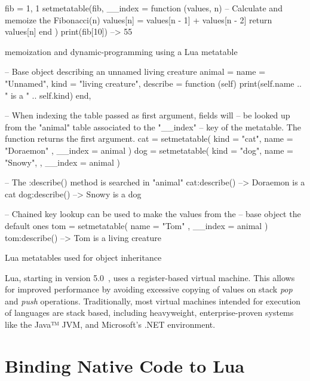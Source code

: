\begin{listing}[H]
  \begin{luacode}
    fib = { 1, 1 }
    setmetatable(fib, {
      __index = function (values, n)
        -- Calculate and memoize the Fibonacci(n)
        values[n] = values[n - 1] + values[n - 2]
        return values[n]
      end
    })
    print(fib[10])  --> 55
  \end{luacode}
  \caption{\Gls{memoization} and \gls{dynamic-programming} using a Lua metatable}
	\label{lst:lua-example-memoize}
\end{listing}

\begin{listing}[H]
  \begin{luacode}
    -- Base object describing an unnamed living creature
    animal = {
      name = "Unnamed",
      kind = "living creature",
      describe = function (self)
        print(self.name .. " is a " .. self.kind)
      end,
    }

    -- When indexing the table passed as first argument, fields will
    -- be looked up from the "animal" table associated to the "__index"
    -- key of the metatable. The function returns the first argument.
    cat = setmetatable({ kind = "cat", name = "Doraemon" },
                       { __index = animal })
    dog = setmetatable({ kind = "dog", name = "Snowy", },
                       { __index = animal })

    -- The :describe() method is searched in "animal"
    cat:describe()  --> Doraemon is a cat
    dog:describe()  --> Snowy is a dog

    -- Chained key lookup can be used to make the values from the
    -- base object the default ones
    tom = setmetatable({ name = "Tom" }, { __index = animal  })
    tom:describe()  --> Tom is a living creature
  \end{luacode}
  \caption{Lua metatables used for object inheritance}
  \label{lst:lua-example-meta-oo}
\end{listing}

Lua, starting in version 5.0~\cite{lua50-impl}, uses a register-based virtual
machine. This allows for improved performance by avoiding excessive copying of
values on stack \emph{pop} and \emph{push} operations. Traditionally, most
virtual machines intended for execution of languages are stack based,
including heavyweight, enterprise-proven systems like the Java™ JVM, and
Microsoft's .NET environment.


\section{Binding Native Code to Lua}

